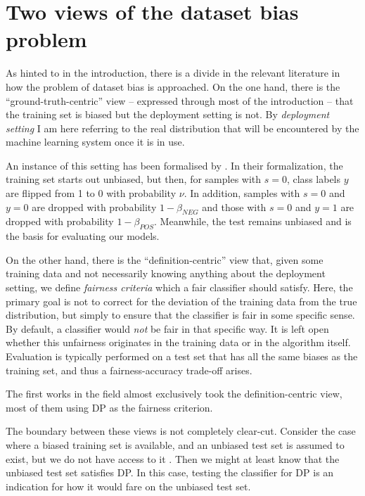 \section{Two views of the dataset bias problem}\label{two-views-of-the-dataset-bias-problem}
As hinted to in the introduction,
there is a divide in the relevant literature in how the problem of dataset bias is approached.
On the one hand, there is the ``ground-truth-centric'' view -- expressed through most of the introduction --
that the training set is biased but the deployment setting is not.
By \emph{deployment setting} I am here referring to the real distribution
that will be encountered by the machine learning system once it is in use.


An instance of this setting has been formalised by \citet{blum2020recovering}.
In their formalization, the training set starts out unbiased,
but then, for samples with \(s=0\), class labels \(y\) are flipped from 1 to 0 with probability \(\nu\).
In addition, samples with \(s=0\) and \(y=0\) are dropped with probability \(1-\beta_\mathit{NEG}\)
and those with \(s=0\) and \(y=1\) are dropped with probability \(1-\beta_\mathit{POS}\).
Meanwhile, the test remains unbiased and is the basis for evaluating our models.

On the other hand, there is the ``definition-centric'' view that,
given some training data and not necessarily knowing anything about the deployment setting,
we define \emph{fairness criteria} which a fair classifier should satisfy.
Here, the primary goal is not to correct for the deviation of the training data from the true distribution,
but simply to ensure that the classifier is fair in some specific sense.
By default, a classifier would \emph{not} be fair in that specific way.
It is left open whether this unfairness originates in the training data or in the algorithm itself.
Evaluation is typically performed on a test set that has all the same biases as the training set,
and thus a fairness-accuracy trade-off arises.

The first works in the field almost exclusively took the definition-centric view,
most of them using \acl{DP} \citep{dwork2012fairness} as the fairness criterion.

The boundary between these views is not completely clear-cut.
Consider the case where a biased training set is available,
and an unbiased test set is assumed to exist, but we do not have access to it \citep{jiang2020identifying}.
Then we might at least know that the unbiased test set satisfies \acf{DP}.
In this case, testing the classifier for \ac{DP} is an indication
for how it would fare on the unbiased test set.

